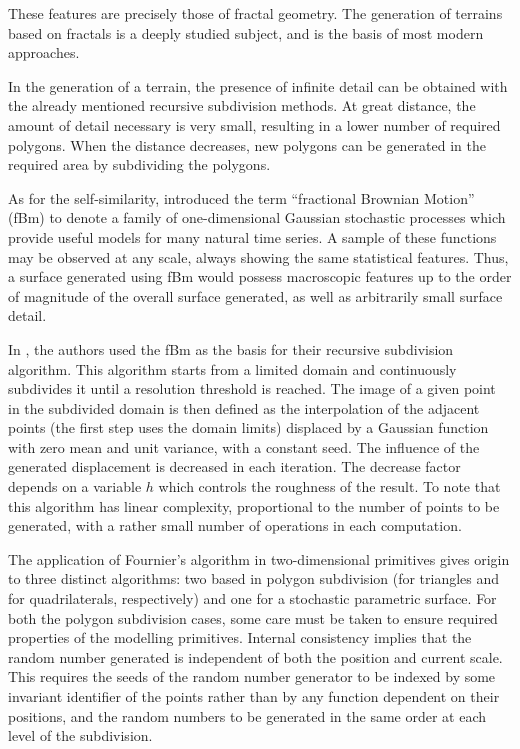 \documentclass{acmtog}
\begin{document}
These features are precisely those of fractal geometry. The generation of terrains based on fractals is a deeply studied subject, and is the basis of most modern approaches.

In the generation of a terrain, the presence of infinite detail can be obtained with the already mentioned recursive subdivision methods. At great distance, the amount of detail necessary is very small, resulting in a lower number of required polygons. When the distance decreases, new polygons can be generated in the required area by subdividing the polygons.

As for the self-similarity, \cite{MandelbrotVanNess1968} introduced the term ``fractional Brownian Motion'' (fBm) to denote a family of one-dimensional Gaussian stochastic processes which provide useful models for many natural time series. A sample of these functions may be observed at any scale, always showing the same statistical features. Thus, a surface generated using fBm would possess macroscopic features up to the order of magnitude of the overall surface generated, as well as arbitrarily small surface detail.

In \cite{Fournier82}, the authors used the fBm as the basis for their recursive subdivision algorithm. This algorithm starts from a limited domain and continuously subdivides it until a resolution threshold is reached. The image of a given point in the subdivided domain is then defined as the interpolation of the adjacent points (the first step uses the domain limits) displaced by a Gaussian function with zero mean and unit variance, with a constant seed. The influence of the generated displacement is decreased in each iteration. The decrease factor depends on a variable $h$ which controls the roughness of the result. To note that this algorithm has linear complexity, proportional to the number of points to be generated, with a rather small number of operations in each computation.

The application of Fournier's algorithm in two-dimensional primitives gives origin to three distinct algorithms: two based in polygon subdivision (for triangles and for quadrilaterals, respectively) and one for a stochastic parametric surface. For both the polygon subdivision cases, some care must be taken to ensure required properties of the modelling primitives. Internal consistency implies that the random number generated is independent of both the position and current scale. This requires the seeds of the random number generator to be indexed by some invariant identifier of the points rather than by any function dependent on their positions, and the random numbers to be generated in the same order at each level of the subdivision.
\end{document}
